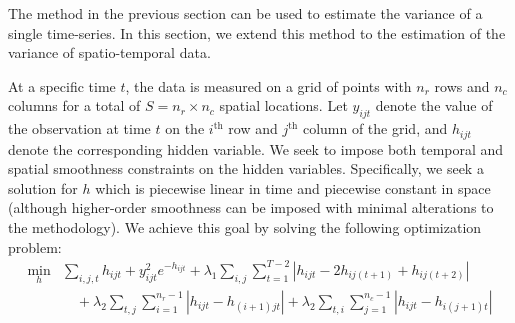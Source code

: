\documentclass{article}
\begin{document}
The method in the previous section can be used to estimate the
variance of a single time-series. In this section, we extend this
method to the estimation of the variance of spatio-temporal data. 

At a specific time $t$, the data is measured on a grid of points with
$n_r$ rows and $n_c$ columns for a total of $S=n_r\times n_c$ spatial
locations. Let $y_{ijt}$ denote the value of the 
observation at time $t$ on the $i^\text{th}$ row and $j^\text{th}$
column of the grid, and $h_{ijt}$ denote the corresponding hidden
variable. We seek to impose both temporal and spatial smoothness
constraints on the hidden variables. Specifically, we seek a solution
for $h$ which is piecewise linear in time and piecewise constant in
space (although higher-order smoothness can be imposed with minimal
alterations to the methodology). We achieve this goal
by solving the following optimization problem: 
\begin{align}
\min_h &\sum_{i,j,t}h_{ijt}+y_{ijt}^2e^{-h_{ijt}}
+\lambda_1 \sum_{i,j} \sum_{t=1}^{T-2} \left|h_{ijt}-2h_{ij(t+1)}+h_{ij(t+2)}\right|\\
&\quad+\lambda_2 \sum_{t,j} \sum_{i=1}^{n_r-1} \left|h_{ijt}-h_{(i+1)jt}\right|
+\lambda_2 \sum_{t,i} \sum_{j=1}^{n_c-1} \left|h_{ijt}-h_{i(j+1)t}\right|
\label{eq:l1tf_var_st}
\end{align}
\end{document}
